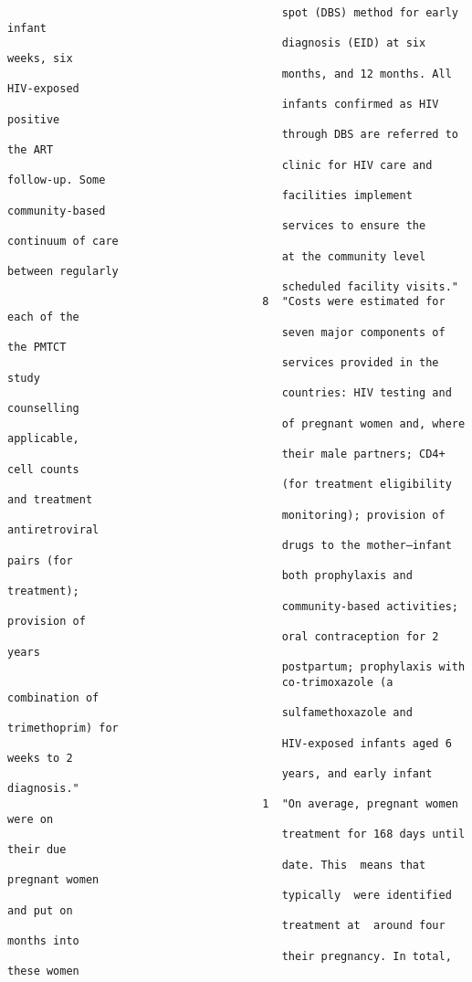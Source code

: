 \documentclass{article}
\begin{document}
\begin{verbatim}
                                          spot (DBS) method for early infant
                                          diagnosis (EID) at six weeks, six
                                          months, and 12 months. All HIV-exposed
                                          infants confirmed as HIV positive
                                          through DBS are referred to the ART
                                          clinic for HIV care and follow-up. Some
                                          facilities implement community-based
                                          services to ensure the continuum of care
                                          at the community level between regularly
                                          scheduled facility visits."
                                       8  "Costs were estimated for each of the
                                          seven major components of the PMTCT
                                          services provided in the study
                                          countries: HIV testing and counselling
                                          of pregnant women and, where applicable,
                                          their male partners; CD4+ cell counts
                                          (for treatment eligibility and treatment
                                          monitoring); provision of antiretroviral
                                          drugs to the mother–infant pairs (for
                                          both prophylaxis and treatment);
                                          community-based activities; provision of
                                          oral contraception for 2 years
                                          postpartum; prophylaxis with
                                          co-trimoxazole (a combination of
                                          sulfamethoxazole and trimethoprim) for
                                          HIV-exposed infants aged 6 weeks to 2
                                          years, and early infant diagnosis."
                                       1  "On average, pregnant women were on
                                          treatment for 168 days until  their due
                                          date. This  means that pregnant women
                                          typically  were identified  and put on
                                          treatment at  around four months into
                                          their pregnancy. In total,  these women

\end{verbatim}
\end{document}
